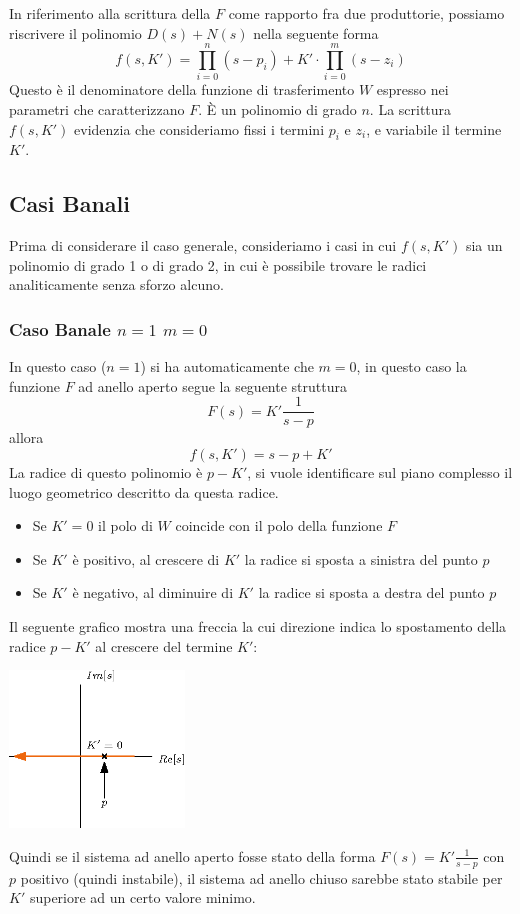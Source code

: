 \documentclass[10pt, letterpaper]{report}
\begin{document}
In riferimento alla scrittura della $F$ come rapporto fra due produttorie, possiamo riscrivere il polinomio $D(s)+N(s)$ nella seguente forma 
$$f(s,K')=\displaystyle\prod_{i=0}^n(s-p_i)+K'\cdot \displaystyle\prod_{i=0}^m(s-z_i) $$
Questo è il denominatore della funzione di trasferimento $W$ espresso nei parametri che caratterizzano $F$. È un polinomio di grado $n$. La scrittura $f(s,K')$ evidenzia che consideriamo fissi i termini $p_i$ e $z_i$, e variabile il termine $K'$.
\subsection{Casi Banali}
Prima di considerare il caso generale, consideriamo i casi in cui $f(s,K')$ sia un polinomio di grado 1 o di grado 2, in cui è possibile trovare le radici analiticamente senza sforzo alcuno. 
\subsubsection{Caso Banale $n=1$ $m=0$}
In questo caso ($n=1$) si ha automaticamente che $m=0$, in questo caso la funzione $F$ ad anello aperto segue la seguente struttura 
$$ F(s)=K'\frac{1}{s-p}$$
allora 
$$ f(s,K')=s-p+K'$$
La radice di questo polinomio è $p-K'$, si vuole identificare sul piano complesso il luogo geometrico descritto da questa radice. \begin{itemize}
    \item Se $K'=0$ il polo di $W$ coincide con il polo della funzione $F$
    \item Se $K'$ è positivo, al crescere di $K' $ la radice si sposta a sinistra del punto $p$
    \item Se $K'$ è negativo, al diminuire di $K' $ la radice si sposta a destra del punto $p$
\end{itemize}
Il seguente grafico mostra una freccia la cui direzione indica lo spostamento della radice $p-K'$ al crescere del termine $K'$:
\begin{center}
    \includegraphics[width=0.35\textwidth ]{images/luogoRadiciN1.eps}
\end{center}
Quindi se il sistema ad anello aperto fosse stato della forma 
$ F(s)=K'\frac{1}{s-p}$ con $p$ positivo (quindi instabile), il sistema ad anello chiuso sarebbe stato stabile per $K'$ superiore ad un certo valore minimo. \bigskip 
\end{document}
